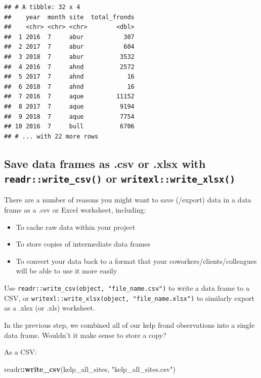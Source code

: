 \documentclass[]{book}
\newenvironment{Shaded}{\begin{snugshade}}{\end{snugshade}}
\newcommand{\KeywordTok}[1]{\textcolor[rgb]{0.13,0.29,0.53}{\textbf{#1}}}
\newcommand{\NormalTok}[1]{#1}
\newcommand{\OperatorTok}[1]{\textcolor[rgb]{0.81,0.36,0.00}{\textbf{#1}}}
\newcommand{\StringTok}[1]{\textcolor[rgb]{0.31,0.60,0.02}{#1}}
\providecommand{\tightlist}{%
  \setlength{\itemsep}{0pt}\setlength{\parskip}{0pt}}
\begin{document}
\begin{verbatim}
## # A tibble: 32 x 4
##    year  month site  total_fronds
##    <chr> <chr> <chr>        <dbl>
##  1 2016  7     abur           307
##  2 2017  7     abur           604
##  3 2018  7     abur          3532
##  4 2016  7     ahnd          2572
##  5 2017  7     ahnd            16
##  6 2018  7     ahnd            16
##  7 2016  7     aque         11152
##  8 2017  7     aque          9194
##  9 2018  7     aque          7754
## 10 2016  7     bull          6706
## # ... with 22 more rows
\end{verbatim}

\hypertarget{save-data-frames-as-.csv-or-.xlsx-with-readrwrite_csv-or-writexlwrite_xlsx}{%
\subsection{\texorpdfstring{Save data frames as .csv or .xlsx with \texttt{readr::write\_csv()} or \texttt{writexl::write\_xlsx()}}{Save data frames as .csv or .xlsx with readr::write\_csv() or writexl::write\_xlsx()}}\label{save-data-frames-as-.csv-or-.xlsx-with-readrwrite_csv-or-writexlwrite_xlsx}}

There are a number of reasons you might want to save (/export) data in a data frame as a .csv or Excel worksheet, including:

\begin{itemize}
\tightlist
\item
  To cache raw data within your project
\item
  To store copies of intermediate data frames
\item
  To convert your data back to a format that your coworkers/clients/colleagues will be able to use it more easily
\end{itemize}

Use \texttt{readr::write\_csv(object,\ "file\_name.csv")} to write a data frame to a CSV, or \texttt{writexl::write\_xlsx(object,\ "file\_name.xlsx")} to similarly export as a .xlsx (or .xls) worksheet.

In the previous step, we combined all of our kelp frond observations into a single data frame. Wouldn't it make sense to store a copy?

As a CSV:

\begin{Shaded}
\begin{Highlighting}[]
\NormalTok{readr}\OperatorTok{::}\KeywordTok{write_csv}\NormalTok{(kelp_all_sites, }\StringTok{"kelp_all_sites.csv"}\NormalTok{)}
\end{Highlighting}
\end{Shaded}
\end{document}
